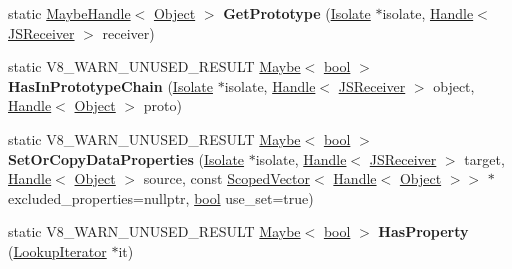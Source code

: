 \begin{DoxyCompactItemize}
static \mbox{\hyperlink{classv8_1_1internal_1_1MaybeHandle}{Maybe\+Handle}}$<$ \mbox{\hyperlink{classv8_1_1internal_1_1Object}{Object}} $>$ {\bfseries Get\+Prototype} (\mbox{\hyperlink{classv8_1_1internal_1_1Isolate}{Isolate}} $\ast$isolate, \mbox{\hyperlink{classv8_1_1internal_1_1Handle}{Handle}}$<$ \mbox{\hyperlink{classv8_1_1internal_1_1JSReceiver}{J\+S\+Receiver}} $>$ receiver)
\item 
\mbox{\label{classv8_1_1internal_1_1JSReceiver_ac770c3b97cf27893711e85380d1965d9}} 
static V8\+\_\+\+W\+A\+R\+N\+\_\+\+U\+N\+U\+S\+E\+D\+\_\+\+R\+E\+S\+U\+LT \mbox{\hyperlink{classv8_1_1Maybe}{Maybe}}$<$ \mbox{\hyperlink{classbool}{bool}} $>$ {\bfseries Has\+In\+Prototype\+Chain} (\mbox{\hyperlink{classv8_1_1internal_1_1Isolate}{Isolate}} $\ast$isolate, \mbox{\hyperlink{classv8_1_1internal_1_1Handle}{Handle}}$<$ \mbox{\hyperlink{classv8_1_1internal_1_1JSReceiver}{J\+S\+Receiver}} $>$ object, \mbox{\hyperlink{classv8_1_1internal_1_1Handle}{Handle}}$<$ \mbox{\hyperlink{classv8_1_1internal_1_1Object}{Object}} $>$ proto)
\item 
\mbox{\label{classv8_1_1internal_1_1JSReceiver_a660fa8c8377ece74a8e17e5a496dc852}} 
static V8\+\_\+\+W\+A\+R\+N\+\_\+\+U\+N\+U\+S\+E\+D\+\_\+\+R\+E\+S\+U\+LT \mbox{\hyperlink{classv8_1_1Maybe}{Maybe}}$<$ \mbox{\hyperlink{classbool}{bool}} $>$ {\bfseries Set\+Or\+Copy\+Data\+Properties} (\mbox{\hyperlink{classv8_1_1internal_1_1Isolate}{Isolate}} $\ast$isolate, \mbox{\hyperlink{classv8_1_1internal_1_1Handle}{Handle}}$<$ \mbox{\hyperlink{classv8_1_1internal_1_1JSReceiver}{J\+S\+Receiver}} $>$ target, \mbox{\hyperlink{classv8_1_1internal_1_1Handle}{Handle}}$<$ \mbox{\hyperlink{classv8_1_1internal_1_1Object}{Object}} $>$ source, const \mbox{\hyperlink{classv8_1_1internal_1_1ScopedVector}{Scoped\+Vector}}$<$ \mbox{\hyperlink{classv8_1_1internal_1_1Handle}{Handle}}$<$ \mbox{\hyperlink{classv8_1_1internal_1_1Object}{Object}} $>$$>$ $\ast$excluded\+\_\+properties=nullptr, \mbox{\hyperlink{classbool}{bool}} use\+\_\+set=true)
\item 
\mbox{\label{classv8_1_1internal_1_1JSReceiver_ad0df2ef8ddcadcd2c2d7d96b19b7c3d3}} 
static V8\+\_\+\+W\+A\+R\+N\+\_\+\+U\+N\+U\+S\+E\+D\+\_\+\+R\+E\+S\+U\+LT \mbox{\hyperlink{classv8_1_1Maybe}{Maybe}}$<$ \mbox{\hyperlink{classbool}{bool}} $>$ {\bfseries Has\+Property} (\mbox{\hyperlink{classv8_1_1internal_1_1LookupIterator}{Lookup\+Iterator}} $\ast$it)
$$
\end{DoxyCompactItemize}
